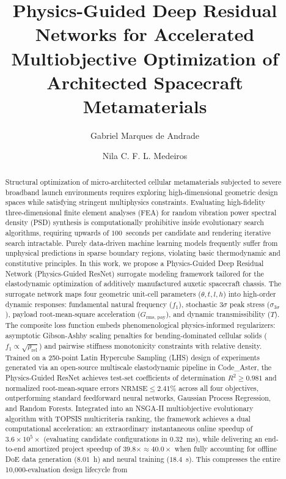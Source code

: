 \documentclass[preprint,12pt,3p]{elsarticle}
\newcommand{\Grmspay}{G_{\text{rms, pay}}}
\begin{document}
\begin{frontmatter}

\title{Physics-Guided Deep Residual Networks for Accelerated Multiobjective Optimization of Architected Spacecraft Metamaterials}

\author[uesc]{Gabriel Marques de Andrade}

\author[uesc]{Nila C. F. L. Medeiros}

\address[uesc]{Department of Exact and Technological Sciences, State University of Santa Cruz (UESC), Rodovia Jorge Amado km 16, Ilh\'eus, BA 45662-900, Brazil}

\begin{abstract}
Structural optimization of micro-architected cellular metamaterials subjected to severe broadband launch environments requires exploring high-dimensional geometric design spaces while satisfying stringent multiphysics constraints. Evaluating high-fidelity three-dimensional finite element analyses (FEA) for random vibration power spectral density (PSD) synthesis is computationally prohibitive inside evolutionary search algorithms, requiring upwards of $100$~seconds per candidate and rendering iterative search intractable. Purely data-driven machine learning models frequently suffer from unphysical predictions in sparse boundary regions, violating basic thermodynamic and constitutive principles. In this work, we propose a Physics-Guided Deep Residual Network (Physics-Guided ResNet) surrogate modeling framework tailored for the elastodynamic optimization of additively manufactured auxetic spacecraft chassis. The surrogate network maps four geometric unit-cell parameters ($\theta, t, l, h$) into high-order dynamic responses: fundamental natural frequency ($f_1$), stochastic $3\sigma$ peak stress ($\sigma_{3\sigma}$), payload root-mean-square acceleration ($\Grmspay$), and dynamic transmissibility ($T$). The composite loss function embeds phenomenological physics-informed regularizers: asymptotic Gibson-Ashby scaling penalties for bending-dominated cellular solids ($f_1 \propto \sqrt{\rho_{\text{rel}}}$) and pairwise stiffness monotonicity constraints with relative density. Trained on a 250-point Latin Hypercube Sampling (LHS) design of experiments generated via an open-source multiscale elastodynamic pipeline in Code\_Aster, the Physics-Guided ResNet achieves test-set coefficients of determination $R^2 \ge 0.981$ and normalized root-mean-square errors $\text{NRMSE} \le 2.41\%$ across all four objectives, outperforming standard feedforward neural networks, Gaussian Process Regression, and Random Forests. Integrated into an NSGA-II multiobjective evolutionary algorithm with TOPSIS multicriteria ranking, the framework achieves a dual computational acceleration: an extraordinary instantaneous online speedup of $3.6 \times 10^5\times$ (evaluating candidate configurations in $0.32$~ms), while delivering an end-to-end amortized project speedup of $39.8\times \approx 40.0\times$ when fully accounting for offline DoE data generation ($8.01$~h) and neural training ($18.4$~s). This compresses the entire 10,000-evaluation design lifecycle from 
\end{abstract}
\end{frontmatter}
\end{document}
